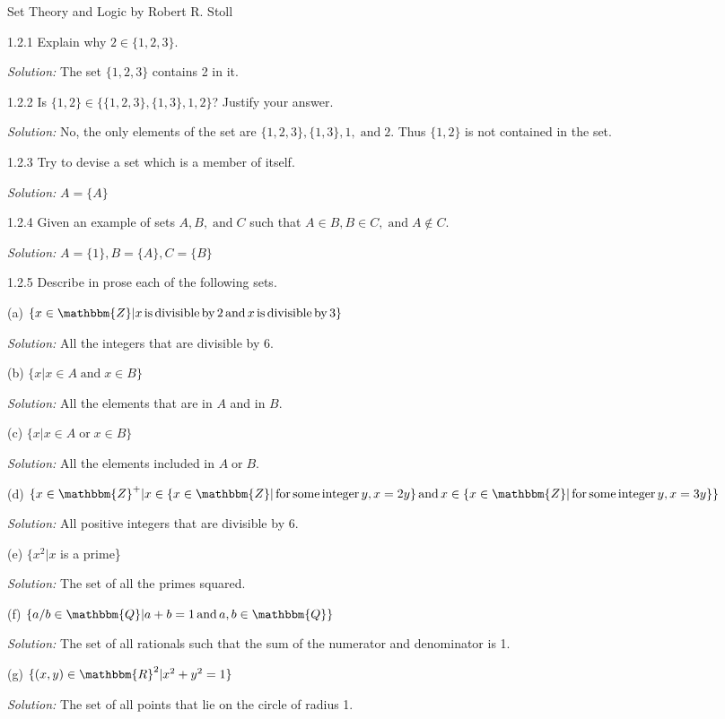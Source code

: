 \documentclass{letter}
\newcommand{\nin}{\not\in}
\newcommand{\tmop}[1]{\ensuremath{\operatorname{#1}}}
\newcommand{\tmtextit}[1]{{\itshape{#1}}}
\begin{document}
Set Theory and Logic by Robert R. Stoll

1.2.1 Explain why $2 \in \{1, 2, 3\}$.

\tmtextit{Solution:} The set $\{1, 2, 3\}$ contains 2 in it.

1.2.2 Is $\{1, 2\} \in \{\{1, 2, 3\}, \{1, 3\}, 1, 2\}$? Justify your answer.

\tmtextit{Solution:} No, the only elements of the set are $\{1, 2, 3\}, \{1,
3\}, 1, \tmop{and} 2$. Thus $\{1, 2\}$ is not contained in the set.

1.2.3 Try to devise a set which is a member of itself.

\tmtextit{Solution:} $A =\{A\}$

1.2.4 Given an example of sets $A, B, \tmop{and} C$ such that $A \in B, B \in
C, \tmop{and} A \nin C$.

\tmtextit{Solution:} $A =\{1\}, B =\{A\}, C =\{B\}$

1.2.5 Describe in prose each of the following sets.

(a) $\{x \in \mathbbm{Z}| x \tmop{is} \tmop{divisible} \tmop{by} 2 \tmop{and}
x \tmop{is} \tmop{divisible} \tmop{by} 3\}$

\tmtextit{Solution:} All the integers that are divisible by 6.

(b) $\{x | x \in A \tmop{and} x \in B\}$

\tmtextit{Solution:} All the elements that are in $A$ and in $B$.

(c) $\{x| x \in A \tmop{or} x \in B\}$

\tmtextit{Solution:} All the elements included in $A \tmop{or} B$.

(d) $\{x \in \mathbbm{Z}^+ | x \in \{x \in \mathbbm{Z}| \tmop{for} \tmop{some}
\tmop{integer} y, x = 2 y\} \tmop{and} x \in \{x \in \mathbbm{Z}| \tmop{for}
\tmop{some} \tmop{integer} y, x = 3 y\}\}$

\tmtextit{Solution:} All positive integers that are divisible by 6.

(e) $\{x^2 | x$ is a prime\}

\tmtextit{Solution:} The set of all the primes squared.

(f) $\{a / b \in \mathbbm{Q}| a + b = 1 \tmop{and} a, b \in \mathbbm{Q}\}$

\tmtextit{Solution:} The set of all rationals such that the sum of the
numerator and denominator is 1.

(g) $\{(x, y) \in \mathbbm{R}^2 | x^2 + y^2 = 1\}$

\tmtextit{Solution:} The set of all points that lie on the circle of radius 1.
\end{document}
